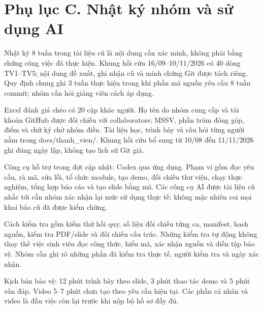 \documentclass[13pt,a4paper]{extreport}
\begin{document}
\section*{Phụ lục C. Nhật ký nhóm và sử dụng AI}
Nhật ký 8 tuần trong tài liệu cũ là nội dung cần xác minh, không phải bằng chứng công việc đã thực hiện. Khung hồi cứu 16/09–10/11/2026 có 40 dòng TV1–TV5; nội dung đề xuất, ghi nhận cũ và minh chứng Git được tách riêng. Quy định chung ghi 3 tuần thực hiện trong khi phần mã nguồn yêu cầu 8 tuần commit; nhóm cần hỏi giảng viên cách áp dụng.
\par
Excel đánh giá chéo có 20 cặp khác người. Họ tên do nhóm cung cấp và tài khoản GitHub được đối chiếu với collaborators; MSSV, phần trăm đóng góp, điểm và chữ ký chờ nhóm điền. Tài liệu học, trình bày và câu hỏi từng người nằm trong docs/thanh\_vien/. Khung hồi cứu bổ sung từ 10/08 đến 11/11/2026 ghi đúng ngày lập, không tạo lịch sử Git giả.
\par
Công cụ hỗ trợ trong đợt cập nhật: Codex qua ứng dụng. Phạm vi gồm đọc yêu cầu, rà mã, sửa lỗi, tổ chức module, tạo demo, đối chiếu thư viện, chạy thực nghiệm, tổng hợp báo cáo và tạo slide bằng mã. Các công cụ AI được tài liệu cũ nhắc tới cần nhóm xác nhận lại mức sử dụng thực tế; không mặc nhiên coi mọi khai báo cũ đã được kiểm chứng.
\par
Cách kiểm tra gồm kiểm thử hồi quy, số liệu đối chiếu từng ca, manifest, hash nguồn, kiểm tra PDF/slide và đối chiếu cấu trúc. Những kiểm tra tự động không thay thế việc sinh viên đọc công thức, hiểu mã, xác nhận nguồn và diễn tập bảo vệ. Nhóm cần ghi rõ những phần đã kiểm tra thực tế, người kiểm tra và ngày xác nhận.
\par
Kịch bản bảo vệ: 12 phút trình bày theo slide, 3 phút thao tác demo và 5 phút vấn đáp. Video 5–7 phút chưa tạo theo yêu cầu hiện tại. Các phần cá nhân và video là đầu việc còn lại trước khi nộp bộ hồ sơ đầy đủ.
\par
\end{document}
